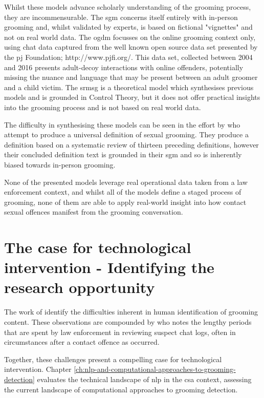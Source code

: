 \documentclass[12pt,a4paper,oneside]{report}
\begin{document}
Whilst these models advance scholarly understanding of the grooming process, they are incommensurable.  The \gls{sgm} concerns itself entirely with in-person grooming and, whilst validated by experts, is based on fictional "vignettes" and not on real world data.  The \gls{ogdm} focusses on the online grooming context only, using chat data captured from the well known open source data set presented by the \gls{pj} Foundation; http://www.pjfi.org/.  This data set, collected between 2004 and 2016 presents adult-decoy interactions with online offenders, potentially missing the nuance and language that may be present between an adult groomer and a child victim.  The \gls{srmsg} is a theoretical model which synthesises previous models and is grounded in Control Theory, but it does not offer practical insights into the grooming process and is not based on real world data.

The difficulty in synthesising these models can be seen in the effort by \citet{winters2022universal} who attempt to produce a universal definition of sexual grooming.  They produce a definition based on a systematic review of thirteen preceding definitions, however their concluded definition text is grounded in their \gls{sgm} and so is inherently biased towards in-person grooming. 

None of the presented models leverage real operational data taken from a law enforcement context, and whilst all of the models define a staged process of grooming, none of them are able to apply real-world insight into how contact sexual offences manifest from the grooming conversation.

\section{The case for technological intervention - Identifying the research opportunity}
\label{sec:the-case-for-technological-intervention}
The work of \citet{winters2016knew,winters2017stages} identify the difficulties inherent in human identification of grooming content.  These observations are compounded by \citet{li2020identifying} who notes the lengthy periods that are spent by law enforcement in reviewing suspect chat logs, often in circumstances after a contact offence as occurred.

Together, these challenges present a compelling case for technological intervention. Chapter \ref{ch:nlp-and-computational-approaches-to-grooming-detection} evaluates the technical landscape of \gls{nlp} in the \gls{csa} context, assessing the current landscape of computational approaches to grooming detection.
\end{document}
